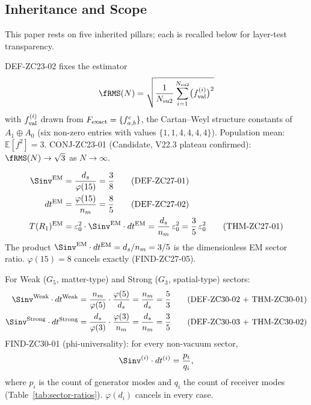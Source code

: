 \documentclass[12pt, a4paper]{article}
\begin{document}
\tableofcontents
\vspace{1em}

\subsection{Inheritance and Scope}
\label{sec:inherit}

This paper rests on five inherited pillars; each is recalled
below for layer-test transparency.

\begin{formalbox}[title={Pillar 1: ZC23 $\fRMS$ estimator
  (CONJ-ZC23-01)}]
DEF-ZC23-02 fixes the estimator
\[
  \fRMS(N) = \sqrt{\frac{1}{N_{\rm su2}}
    \sum_{i=1}^{N_{\rm su2}} \bigl(f_{\rm val}^{(i)}\bigr)^2}
\]
with $f_{\rm val}^{(i)}$ drawn from
$F_{\rm exact} = \{f^c_{a,b}\}$, the Cartan--Weyl structure
constants of $A_1\oplus A_0$ (six non-zero entries with values
$\{1,1,4,4,4,4\}$). Population mean: $\mathbb{E}[f^2] = 3$.
CONJ-ZC23-01 (Candidate, V22.3 plateau confirmed):
$\fRMS(N) \to \sqrt{3}$ as $N\to\infty$.
\end{formalbox}

\begin{formalbox}[title={Pillar 2: ZC27 EM sector $R_1$ data
  (THM-ZC27-01)}]
\begin{align*}
  \Sinv^{\rm EM} &= \frac{d_s}{\varphi(15)} = \frac{3}{8}
    \tag{DEF-ZC27-01}\\
  dt^{\rm EM} &= \frac{\varphi(15)}{n_m} = \frac{8}{5}
    \tag{DEF-ZC27-02}\\
  T(R_1)^{\rm EM} &= \varepsilon_0^2 \cdot \Sinv^{\rm EM}
    \cdot dt^{\rm EM} = \frac{d_s}{n_m}\,\varepsilon_0^2
    = \frac{3}{5}\,\varepsilon_0^2
    \tag{THM-ZC27-01}
\end{align*}
The product $\Sinv^{\rm EM}\cdot dt^{\rm EM} = d_s/n_m = 3/5$
is the dimensionless EM sector ratio. $\varphi(15) = 8$ cancels
exactly (FIND-ZC27-05).
\end{formalbox}

\begin{formalbox}[title={Pillar 3: ZC30 v2 Weak and Strong
  sector data, phi-universality (FIND-ZC30-01)}]
For Weak ($G_5$, matter-type) and Strong ($G_3$, spatial-type)
sectors:
\begin{align*}
  \Sinv^{\rm Weak}\cdot dt^{\rm Weak}
    &= \frac{n_m}{\varphi(5)}\cdot\frac{\varphi(5)}{d_s}
     = \frac{n_m}{d_s} = \frac{5}{3}
    \tag{DEF-ZC30-02 + THM-ZC30-01}\\
  \Sinv^{\rm Strong}\cdot dt^{\rm Strong}
    &= \frac{d_s}{\varphi(3)}\cdot\frac{\varphi(3)}{n_m}
     = \frac{d_s}{n_m} = \frac{3}{5}
    \tag{DEF-ZC30-03 + THM-ZC30-02}
\end{align*}
FIND-ZC30-01 (phi-universality): for every non-vacuum sector,
\[
  \Sinv^{(i)}\cdot dt^{(i)} = \frac{p_i}{q_i},
\]
where $p_i$ is the count of generator modes and $q_i$ the
count of receiver modes (Table~\ref{tab:sector-ratios}).
$\varphi(d_i)$ cancels in every case.
\end{formalbox}
\end{document}
